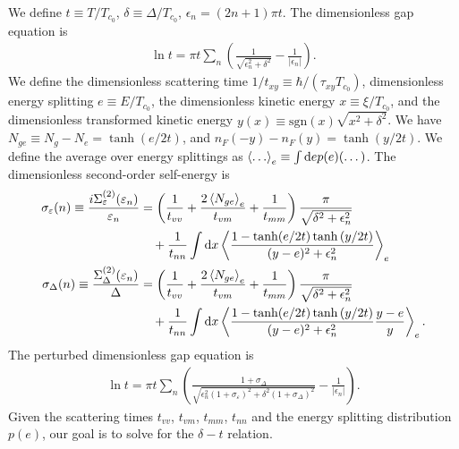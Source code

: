 \documentclass[aps,prl,preprint]{revtex4-2}
\begin{document}
We define $t \equiv T/T_{c_0}$, $\delta \equiv \Delta/T_{c_0}$, $\epsilon_n = (2n + 1)\pi t$.
The dimensionless gap equation is
\begin{align}
    \ln{t} = \pi t\sum_n\left(\frac{1}{\sqrt{\epsilon_n^2 + \delta^2}} - \frac{1}{|\epsilon_n|}\right).
\end{align}
We define the dimensionless scattering time $1/t_{xy} \equiv \hbar/(\tau_{xy}T_{c_0})$,
dimensionless energy splitting $e \equiv E/T_{c_0}$,
the dimensionless kinetic energy $x \equiv \xi/T_{c_0}$,
and the dimensionless transformed kinetic energy $y(x) \equiv \text{sgn}(x)\sqrt{x^2 + \delta^2}$.
We have $N_{ge} \equiv N_g - N_e = \tanh(e/2t)$, and $n_F(-y) - n_F(y) = \tanh(y/2t)$.
We define the average over energy splittings as $\ev{\dots}_e \equiv \int\dd e p(e)(\dots)$.
The dimensionless second-order self-energy is
\begin{align}
    \sigma_\varepsilon(n) \equiv \frac{i\Sigma^{(2)}_\varepsilon(\varepsilon_n)}{\varepsilon_n} & = \left(\frac{1}{t_{vv}} + \frac{2\ev{N_{ge}}_e}{t_{vm}} + \frac{1}{t_{mm}}\right)\frac{\pi}{\sqrt{\delta^2+\epsilon_n^2}}   \nonumber \\
                                                                                                & \quad + \frac{1}{t_{nn}}\int\dd x\ev{\frac{1-\tanh(e/2t)\tanh{(y/2t)}}{(y-e)^2 + \epsilon_n^2}}_e                                      \\
    \sigma_\Delta(n) \equiv \frac{\Sigma^{(2)}_\Delta(\varepsilon_n)}{\Delta}                   & = \left(\frac{1}{t_{vv}} + \frac{2\ev{N_{ge}}_e}{t_{vm}} + \frac{1}{t_{mm}}\right)\frac{\pi}{\sqrt{\delta^2+\epsilon_n^2}}   \nonumber \\
                                                                                                & \quad + \frac{1}{t_{nn}}\int\dd x\ev{\frac{1-\tanh(e/2t)\tanh{(y/2t)}}{(y-e)^2 + \epsilon_n^2}\frac{y-e}{y}}_e.
\end{align}
The perturbed dimensionless gap equation is
\begin{align}
    \ln{t} = \pi t \sum_n\left(\frac{1 + \sigma_\Delta}{\sqrt{\epsilon_n^2(1 + \sigma_\varepsilon)^2 + \delta^2(1 + \sigma_\Delta)^2}} - \frac{1}{|\epsilon_n|}\right).
\end{align}
Given the scattering times $t_{vv}$, $t_{vm}$, $t_{mm}$, $t_{nn}$ and the energy splitting distribution $p(e)$, our goal is to solve for the $\delta - t$ relation.
\end{document}
